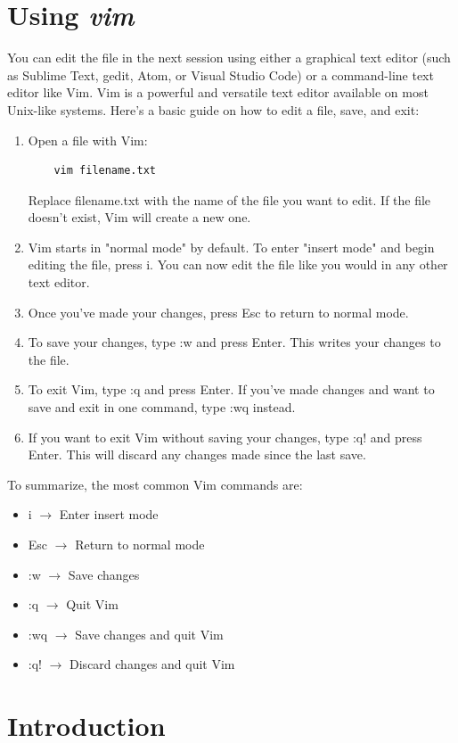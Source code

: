\documentclass{article}
\begin{document}
\section{Using \textit{vim}}
You can edit the file in the next session using either a graphical text editor (such as Sublime Text, gedit, Atom, or Visual Studio Code) or a command-line text editor like Vim. Vim is a powerful and versatile text editor available on most Unix-like systems. Here's a basic guide on how to edit a file, save, and exit:
\begin{enumerate}
    \item Open a file with Vim:
    \begin{verbatim}
    vim filename.txt
    \end{verbatim}
    Replace filename.txt with the name of the file you want to edit. If the file doesn't exist, Vim will create a new one.
    \item Vim starts in "normal mode" by default. To enter "insert mode" and begin editing the file, press i. You can now edit the file like you would in any other text editor.
    \item Once you've made your changes, press Esc to return to normal mode.
    \item To save your changes, type :w and press Enter. This writes your changes to the file.
    \item To exit Vim, type :q and press Enter. If you've made changes and want to save and exit in one command, type :wq instead.
    \item If you want to exit Vim without saving your changes, type :q! and press Enter. This will discard any changes made since the last save.
\end{enumerate}

To summarize, the most common Vim commands are:
\begin{itemize}
    \item i $\rightarrow$ Enter insert mode
    \item Esc $\rightarrow$ Return to normal mode
    \item :w $\rightarrow$ Save changes
    \item :q $\rightarrow$ Quit Vim
    \item :wq $\rightarrow$ Save changes and quit Vim
    \item :q! $\rightarrow$ Discard changes and quit Vim
\end{itemize}

\newpage
\section{Introduction}
\end{document}
